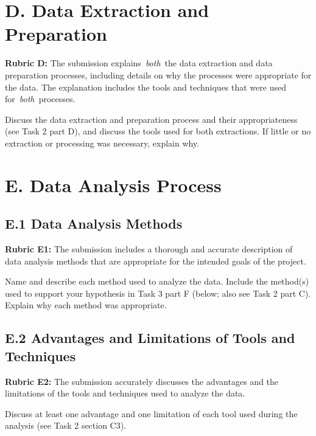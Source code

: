 \hypertarget{d.-data-extraction-and-preparation}{%
\section{D. Data Extraction and
Preparation}\label{d.-data-extraction-and-preparation}}

\textbf{Rubric D:} The submission explains~\emph{both}~the data
extraction and data preparation processes, including details on why the
processes were appropriate for the data. The explanation includes the
tools and techniques that were used for~\emph{both~}processes.

Discuss the data extraction and preparation process and their
appropriateness (see Task 2 part D), and discuss the tools used for both
extractions. If little or no extraction or processing was necessary,
explain why.

\hypertarget{e.-data-analysis-process}{%
\section{E. Data Analysis Process}\label{e.-data-analysis-process}}

\hypertarget{e.1-data-analysis-methods}{%
\subsection{E.1 Data Analysis Methods}\label{e.1-data-analysis-methods}}

\textbf{Rubric E1:} The submission includes a thorough and accurate
description of data analysis methods that are appropriate for the
intended goals of the project.

Name and describe each method used to analyze the data. Include the
method(s) used to support your hypothesis in Task 3 part F (below; also
see Task 2 part C). Explain why each method was appropriate.

\hypertarget{e.2-advantages-and-limitations-of-tools-and-techniques}{%
\subsection{E.2 Advantages and Limitations of Tools and
Techniques}\label{e.2-advantages-and-limitations-of-tools-and-techniques}}

\textbf{Rubric E2:} The submission accurately discusses the advantages
and the limitations of the tools and techniques used to analyze the
data.

Discuss at least one advantage and one limitation of each tool used
during the analysis (see Task 2 section C3).

